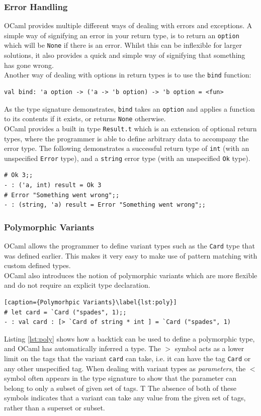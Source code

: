 \documentclass[12pt,a4paper,twoside,openright]{report}
\begin{document}
		\subsubsection*{Error Handling}
		OCaml provides multiple different ways of dealing with errors and exceptions. 
		A simple way of signifying an error in your return type, is to return an \texttt{option} which will be \texttt{None} if there is an error. 
		Whilst this can be inflexible for larger solutions, it also provides a quick and simple way of signifying that something has gone wrong.\\

		Another way of dealing with options in return types is to use the \texttt{bind} function:
		\begin{lstlisting}
val bind: 'a option -> ('a -> 'b option) -> 'b option = <fun>
		\end{lstlisting} 
		As the type signature demonstrates, \texttt{bind} takes an \texttt{option} and applies a function to its contents if it exists, or returns \texttt{None} otherwise.\\
		
		OCaml provides a built in type \texttt{Result.t} which is an extension of optional return types, where the programmer is able to define arbitrary data to accompany the error type. 
		The following demonstrates a successful return type of \texttt{int} (with an unspecified \texttt{Error} type), and a \texttt{string} error type (with an unspecified \texttt{Ok} type).
		\begin{lstlisting}
# Ok 3;;
- : ('a, int) result = Ok 3
# Error "Something went wrong";;
- : (string, 'a) result = Error "Something went wrong";;
		\end{lstlisting} 

		\subsubsection*{Polymorphic Variants}
		OCaml allows the programmer to define variant types such as the \texttt{Card} type that was defined earlier. This makes it very easy to make use of pattern matching with custom defined types.\\
		
		OCaml also introduces the notion of polymorphic variants which are more flexible and do not require an explicit type declaration.
		\begin{lstlisting}[caption={Polymorhpic Variants}\label{lst:poly}]
# let card = `Card ("spades", 1);;
- : val card : [> `Card of string * int ] = `Card ("spades", 1)
		\end{lstlisting}
		Listing \ref{lst:poly} shows how a backtick can be used to define a polymorphic type, and OCaml has automatically inferred a type. 
		The $>$ symbol acts as a lower limit on the tags that the variant \texttt{card} can take, i.e. it can have the tag \texttt{Card} or any other unspecified tag.
		When dealing with variant types as \textit{parameters}, the $<$ symbol often appears in the type signature to show that the parameter can belong to only a subset of given set of tags. T
		The absence of both of these symbols indicates that a variant can take any value from the given set of tags, rather than a superset or subset. 
\end{document}
